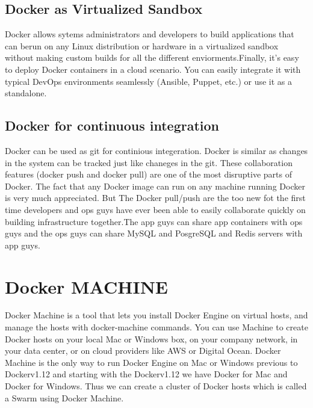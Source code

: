 \documentclass[9pt,twocolumn,twoside]{styles/osajnl}
\begin{document}
\subsection{Docker as Virtualized Sandbox}
\cite{www-docker-1} Docker allows sytems administrators and developers
to build applications that can berun on any Linux distribution or
hardware in a virtualized sandbox without making custom builds for all
the different enviorments.Finally, it’s easy to deploy Docker
containers in a cloud scenario. You can easily integrate it with
typical DevOps environments seamlessly (Ansible, Puppet, etc.) or use
it as a standalone.

\subsection{Docker for continuous integration}
Docker can be used as git for continious integeration. Docker is
similar as changes in the system can be tracked just like chaneges in
the git.  These collaboration features (docker push and docker pull)
are one of the most disruptive parts of Docker. The fact that any
Docker image can run on any machine running Docker is very much
appreciated. But The Docker pull/push are the too new fot the first
time developers and ops guys have ever been able to easily collaborate
quickly on building infrastructure together.\cite{www-docker-2}The app
guys can share app containers with ops guys and the ops guys can share
MySQL and PosgreSQL and Redis servers with app guys.




\section{Docker MACHINE}

\cite{www-docker-machine}Docker Machine is a tool that lets you install 
Docker Engine on virtual hosts, and manage the hosts with docker-machine 
commands. You can use Machine to create Docker hosts on your local Mac 
or Windows box, on your company network, in your data center, or on 
cloud providers like AWS or Digital Ocean. Docker Machine is the only 
way to run Docker Engine on Mac or Windows previous to Dockerv1.12 
and starting with the Dockerv1.12 we have Docker for Mac and Docker for 
Windows. Thus we can create a cluster of Docker hosts which is called
a Swarm using Docker Machine.
\end{document}
